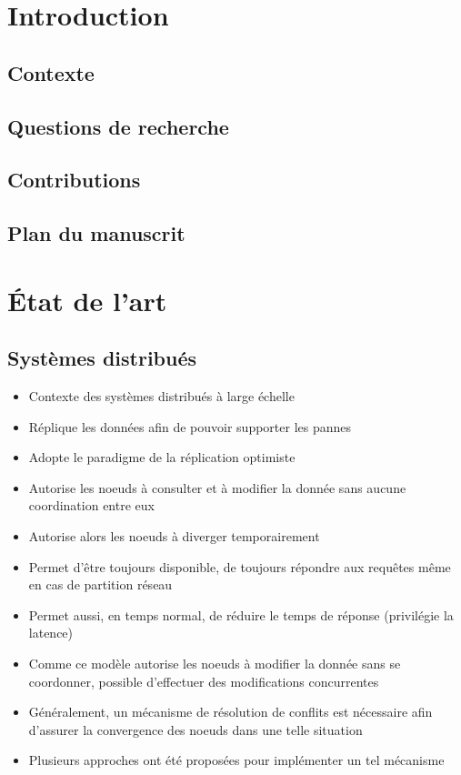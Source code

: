 \documentclass[12pt]{thesul}
\begin{document}
\DontWriteThisInToc
\listoffigures

\mainmatter
\NumberThisInToc
\chapter*{Introduction}
\minitoc
\section{Contexte}
\section{Questions de recherche}
\section{Contributions}
\section{Plan du manuscrit}
% 

% 

\NumberThisInToc
\chapter{État de l'art}
\minitoc

\section{Systèmes distribués}

\begin{itemize}
  \item Contexte des systèmes distribués à large échelle
  \item Réplique les données afin de pouvoir supporter les pannes
  \item Adopte le paradigme de la réplication optimiste \cite{10.1145/1057977.1057980}
  \item Autorise les noeuds à consulter et à modifier la donnée sans aucune coordination entre eux
  \item Autorise alors les noeuds à diverger temporairement
  \item Permet d'être toujours disponible, de toujours répondre aux requêtes même en cas de partition réseau
  \item Permet aussi, en temps normal, de réduire le temps de réponse (privilégie la latence) \cite{pacelc2012}
  \item Comme ce modèle autorise les noeuds à modifier la donnée sans se coordonner, possible d'effectuer des modifications concurrentes
  \item Généralement, un mécanisme de résolution de conflits est nécessaire afin d'assurer la convergence des noeuds dans une telle situation
  \item Plusieurs approches ont été proposées pour implémenter un tel mécanisme
\end{itemize}
\end{document}
